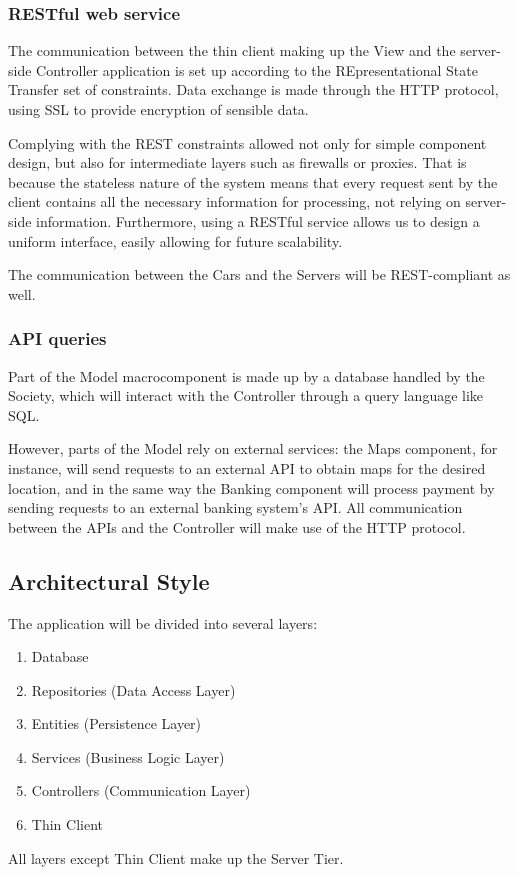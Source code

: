 \documentclass[12pt]{article}
\begin{document}
\subsubsection{RESTful web service}
The communication between the thin client making up the View and the server-side Controller application is set up according to the REpresentational State Transfer set of constraints. Data exchange is made through the HTTP protocol, using SSL to provide encryption of sensible data.

Complying with the REST constraints allowed not only for simple component design, but also for intermediate layers such as firewalls or proxies. That is because the stateless nature of the system means that every request sent by the client contains all the necessary information for processing, not relying on server-side information. Furthermore, using a RESTful service allows us to design a uniform interface, easily allowing for future scalability.

The communication between the Cars and the Servers will be REST-compliant as well.

\subsubsection{API queries}
Part of the Model macrocomponent is made up by a database handled by the Society, which will interact with the Controller through a query language like SQL.

However, parts of the Model rely on external services: the Maps component, for instance, will send requests to an external API to obtain maps for the desired location, and in the same way the Banking component will process payment by sending requests to an external banking system's API. All communication between the APIs and the Controller will make use of the HTTP protocol.

\subsection{Architectural Style}
The application will be divided into several layers:
\begin{enumerate}
	\item Database
	\item Repositories (Data Access Layer)
	\item Entities (Persistence Layer)
	\item Services (Business Logic Layer)
	\item Controllers (Communication Layer)
	\item Thin Client
\end{enumerate}
All layers except Thin Client make up the Server Tier.
\end{document}
